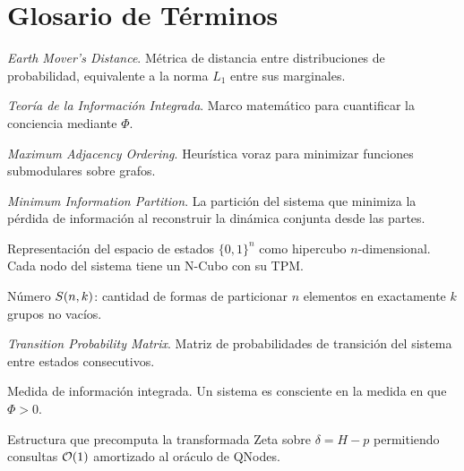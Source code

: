 \section{Glosario de Términos}
\label{ap:glosario}

\begin{description}[leftmargin=2.5cm, style=nextline]
    \item[\textbf{EMD}] \textit{Earth Mover's Distance}. Métrica de distancia entre distribuciones de probabilidad, equivalente a la norma $L_1$ entre sus marginales.
    \item[\textbf{IIT}] \textit{Teoría de la Información Integrada}. Marco matemático para cuantificar la conciencia mediante $\Phi$.
    \item[\textbf{MAO}] \textit{Maximum Adjacency Ordering}. Heurística voraz para minimizar funciones submodulares sobre grafos.
    \item[\textbf{MIP}] \textit{Minimum Information Partition}. La partición del sistema que minimiza la pérdida de información al reconstruir la dinámica conjunta desde las partes.
    \item[\textbf{N-Cubo}] Representación del espacio de estados $\{0,1\}^n$ como hipercubo $n$-dimensional. Cada nodo del sistema tiene un N-Cubo con su TPM.
    \item[\textbf{Stirling}] Número $S(n,k)$: cantidad de formas de particionar $n$ elementos en exactamente $k$ grupos no vacíos.
    \item[\textbf{TPM}] \textit{Transition Probability Matrix}. Matriz de probabilidades de transición del sistema entre estados consecutivos.
    \item[\textbf{$\Phi$}] Medida de información integrada. Un sistema es consciente en la medida en que $\Phi > 0$.
    \item[\textbf{Zeta oracle}] Estructura que precomputa la transformada Zeta sobre $\delta = H - p$ permitiendo consultas $\mathcal{O}(1)$ amortizado al oráculo de QNodes.
\end{description}
